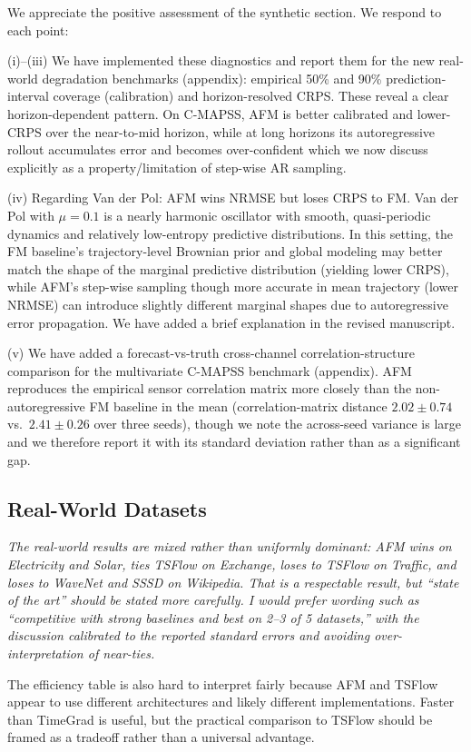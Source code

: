 \documentclass[11pt]{article}
\newcommand{\reviewertext}[1]{%
  \begin{reviewerquote}
    {\color{reviewercolor}\itshape #1}
  \end{reviewerquote}%
}
\newcommand{\authorresponse}[1]{%
    #1\par\medskip
}
\begin{document}
\authorresponse{%
We appreciate the positive assessment of the synthetic section. We respond to each point:

(i)--(iii) We have implemented these diagnostics and report them for the new real-world degradation benchmarks (appendix): empirical 50\% and 90\% prediction-interval coverage (calibration) and horizon-resolved CRPS. These reveal a clear horizon-dependent pattern. On C-MAPSS, AFM is better calibrated and lower-CRPS over the near-to-mid horizon, while at long horizons its autoregressive rollout accumulates error and becomes over-confident which we now discuss explicitly as a property/limitation of step-wise AR sampling.

(iv) Regarding Van der Pol: AFM wins NRMSE but loses CRPS to FM. Van der Pol with $\mu=0.1$ is a nearly harmonic oscillator with smooth, quasi-periodic dynamics and relatively low-entropy predictive distributions. In this setting, the FM baseline's trajectory-level Brownian prior and global modeling may better match the shape of the marginal predictive distribution (yielding lower CRPS), while AFM's step-wise sampling though more accurate in mean trajectory (lower NRMSE) can introduce slightly different marginal shapes due to autoregressive error propagation. We have added a brief explanation in the revised manuscript.

(v) We have added a forecast-vs-truth cross-channel correlation-structure comparison for the multivariate C-MAPSS benchmark (appendix). AFM reproduces the empirical sensor correlation matrix more closely than the non-autoregressive FM baseline in the mean (correlation-matrix distance $2.02\!\pm\!0.74$ vs.\ $2.41\!\pm\!0.26$ over three seeds), though we note the across-seed variance is large and we therefore report it with its standard deviation rather than as a significant gap.
}

\subsection{Real-World Datasets}

\reviewertext{%
The real-world results are mixed rather than uniformly dominant: AFM wins on Electricity and Solar, ties TSFlow on Exchange, loses to TSFlow on Traffic, and loses to WaveNet and SSSD on Wikipedia. That is a respectable result, but ``state of the art'' should be stated more carefully. I would prefer wording such as ``competitive with strong baselines and best on 2--3 of 5 datasets,'' with the discussion calibrated to the reported standard errors and avoiding over-interpretation of near-ties.

The efficiency table is also hard to interpret fairly because AFM and TSFlow appear to use different architectures and likely different implementations. Faster than TimeGrad is useful, but the practical comparison to TSFlow should be framed as a tradeoff rather than a universal advantage.
}
\end{document}
